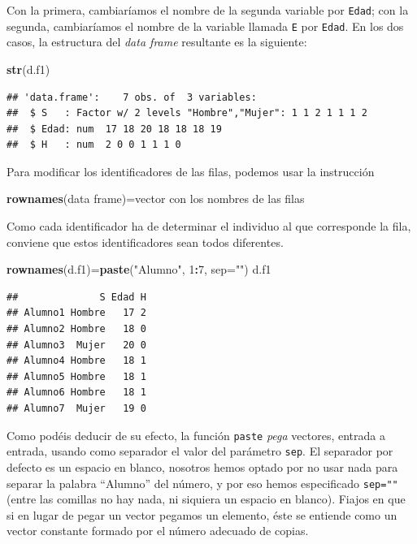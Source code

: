 \documentclass[]{book}
\newenvironment{Shaded}{\begin{snugshade}}{\end{snugshade}}
\newcommand{\DataTypeTok}[1]{\textcolor[rgb]{0.13,0.29,0.53}{#1}}
\newcommand{\DecValTok}[1]{\textcolor[rgb]{0.00,0.00,0.81}{#1}}
\newcommand{\KeywordTok}[1]{\textcolor[rgb]{0.13,0.29,0.53}{\textbf{#1}}}
\newcommand{\NormalTok}[1]{#1}
\newcommand{\OperatorTok}[1]{\textcolor[rgb]{0.81,0.36,0.00}{\textbf{#1}}}
\newcommand{\StringTok}[1]{\textcolor[rgb]{0.31,0.60,0.02}{#1}}
\theoremstyle{definition}
\theoremstyle{definition}
\theoremstyle{definition}
\theoremstyle{remark}
\begin{document}
Con la primera, cambiaríamos el nombre de la segunda variable por \texttt{Edad}; con la segunda, cambiaríamos el nombre de la variable llamada \texttt{E} por \texttt{Edad}. En los dos casos, la estructura del \emph{data frame} resultante es la siguiente:

\begin{Shaded}
\begin{Highlighting}[]
\KeywordTok{str}\NormalTok{(d.f1)}
\end{Highlighting}
\end{Shaded}

\begin{verbatim}
## 'data.frame':    7 obs. of  3 variables:
##  $ S   : Factor w/ 2 levels "Hombre","Mujer": 1 1 2 1 1 1 2
##  $ Edad: num  17 18 20 18 18 18 19
##  $ H   : num  2 0 0 1 1 1 0
\end{verbatim}

Para modificar los identificadores de las filas, podemos usar la instrucción

\begin{Shaded}
\begin{Highlighting}[]
\KeywordTok{rownames}\NormalTok{(data frame)=vector con los nombres de las filas}
\end{Highlighting}
\end{Shaded}

Como cada identificador ha de determinar el individuo al que corresponde la fila, conviene que estos identificadores sean todos diferentes.

\begin{Shaded}
\begin{Highlighting}[]
\KeywordTok{rownames}\NormalTok{(d.f1)=}\KeywordTok{paste}\NormalTok{(}\StringTok{"Alumno"}\NormalTok{, }\DecValTok{1}\OperatorTok{:}\DecValTok{7}\NormalTok{, }\DataTypeTok{sep=}\StringTok{""}\NormalTok{)}
\NormalTok{d.f1}
\end{Highlighting}
\end{Shaded}

\begin{verbatim}
##              S Edad H
## Alumno1 Hombre   17 2
## Alumno2 Hombre   18 0
## Alumno3  Mujer   20 0
## Alumno4 Hombre   18 1
## Alumno5 Hombre   18 1
## Alumno6 Hombre   18 1
## Alumno7  Mujer   19 0
\end{verbatim}

Como podéis deducir de su efecto, la función \texttt{paste} \emph{pega} vectores, entrada a entrada, usando como separador el valor del parámetro \texttt{sep}. El separador por defecto es un espacio en blanco, nosotros hemos optado por no usar nada para separar la palabra ``Alumno'' del número, y por eso hemos especificado \texttt{sep=""} (entre las comillas no hay nada, ni siquiera un espacio en blanco). Fiajos en que si en lugar de pegar un vector pegamos un elemento, éste se entiende como un vector constante formado por el número adecuado de copias.
\end{document}
